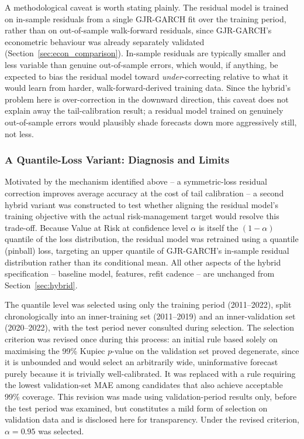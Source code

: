 \documentclass[12pt,a4paper]{article}
\begin{document}
A methodological caveat is worth stating plainly. The residual model is trained on in-sample
residuals from a single GJR-GARCH fit over the training period, rather than on out-of-sample
walk-forward residuals, since GJR-GARCH's econometric behaviour was already separately validated
(Section~\ref{sec:econ_comparison}). In-sample residuals are typically smaller and less variable
than genuine out-of-sample errors, which would, if anything, be expected to bias the residual model
toward \emph{under}-correcting relative to what it would learn from harder, walk-forward-derived
training data. Since the hybrid's problem here is over-correction in the downward direction, this
caveat does not explain away the tail-calibration result; a residual model trained on genuinely
out-of-sample errors would plausibly shade forecasts down more aggressively still, not less.

\subsubsection{A Quantile-Loss Variant: Diagnosis and Limits}\label{sec:hybrid_quantile}

Motivated by the mechanism identified above -- a symmetric-loss residual correction improves
average accuracy at the cost of tail calibration -- a second hybrid variant was constructed to test
whether aligning the residual model's training objective with the actual risk-management target
would resolve this trade-off. Because Value at Risk at confidence level $\alpha$ is itself the
$(1-\alpha)$ quantile of the loss distribution, the residual model was retrained using a quantile
(pinball) loss, targeting an upper quantile of GJR-GARCH's in-sample residual distribution rather
than its conditional mean. All other aspects of the hybrid specification -- baseline model,
features, refit cadence -- are unchanged from Section~\ref{sec:hybrid}.

The quantile level was selected using only the training period (2011--2022), split chronologically
into an inner-training set (2011--2019) and an inner-validation set (2020--2022), with the test
period never consulted during selection. The selection criterion was revised once during this
process: an initial rule based solely on maximising the 99\% Kupiec $p$-value on the validation set
proved degenerate, since it is unbounded and would select an arbitrarily wide, uninformative
forecast purely because it is trivially well-calibrated. It was replaced with a rule requiring the
lowest validation-set MAE among candidates that also achieve acceptable 99\% coverage. This revision
was made using validation-period results only, before the test period was examined, but constitutes
a mild form of selection on validation data and is disclosed here for transparency. Under the
revised criterion, $\alpha=0.95$ was selected.
\end{document}

